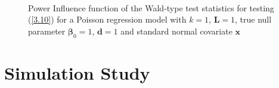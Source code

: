 \documentclass[a4paper]{article}%
\begin{document}
\begin{figure}[h]
\centering
 ~
\newline{} ~
\caption{Power Influence function of the Wald-type test statistics for testing
(\ref{3.10}) for a Poisson regression model with $k=1$, $\boldsymbol{L}=1$,
true null parameter $\boldsymbol{\beta}_{0}=1$, $\boldsymbol{d}=1$ and
standard normal covariate $\boldsymbol{x}$}%
\label{FIG:PIF_test}%
\end{figure}



\section{Simulation Study}
\label{sec6}
\end{document}
